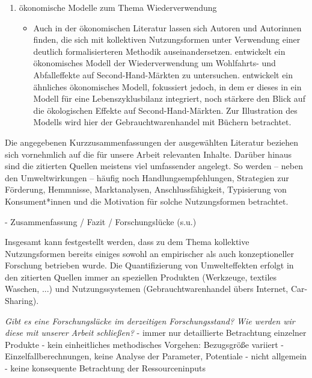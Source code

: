 \documentclass[11pt, titlepage=true]{scrartcl} %
\newcommand{\was}[1]{\small\textit{#1}}
\begin{document}
\begin{enumerate}
\begin{itemize}
       \end{itemize}
     \item ökonomische Modelle zum Thema Wiederverwendung
       \begin{itemize}
         \item Auch in der ökonomischen Literatur lassen sich Autoren und
           Autorinnen finden, die sich mit kollektiven Nutzungsformen
           unter Verwendung einer deutlich formalisierteren Methodik
           auseinandersetzen. \textcite{yokoo_economic_2010} entwickelt ein
           ökonomisches Modell der Wiederverwendung um Wohlfahrts- und
           Abfalleffekte auf Second-Hand-Märkten zu untersuchen.
           \textcite{thomas_environmental_2011} entwickelt ein ähnliches
           ökonomisches Modell, fokussiert jedoch, in dem er dieses in ein Modell für
           eine Lebenszyklusbilanz integriert, noch stärkere den Blick auf die
           ökologischen Effekte auf Second-Hand-Märkten. Zur Illustration des
           Modells wird hier der Gebrauchtwarenhandel mit Büchern betrachtet.       \end{itemize}
\end{enumerate}

Die angegebenen Kurzzusammenfassungen der ausgewählten Literatur beziehen sich
vornehmlich auf die für unsere Arbeit relevanten Inhalte. Darüber hinaus sind
die zitierten Quellen meistens viel umfassender angelegt. So werden --
neben den Umweltwirkungen --  häufig noch
Handlungsempfehlungen, Strategien zur Förderung, Hemmnisse,
Marktanalysen, Anschlussfähigkeit, Typisierung von Konsument*innen und die
Motivation für solche Nutzungsformen betrachtet.

- Zusammenfassung / Fazit / Forschungslücke (s.u.)

Insgesamt kann festgestellt werden, dass zu dem Thema kollektive Nutzungsformen
bereits einiges sowohl an empirischer als auch konzeptioneller Forschung
betrieben wurde. Die Quantifizierung von Umwelteffekten erfolgt in den zitierten
Quellen immer an speziellen Produkten (Werkzeuge, textiles
Waschen, ...) und Nutzungssystemen (Gebrauchtwarenhandel übers Internet,
Car-Sharing). 
 
\was{Gibt es eine Forschungslücke im derzeitigen Forschungsstand? Wie werden wir
 diese mit unserer Arbeit schließen?}
 - immer nur detaillierte Betrachtung einzelner Produkte
 - kein einheitliches methodisches Vorgehen: Bezugsgröße variiert
 - Einzelfallberechnungen, keine Analyse der Parameter, Potentiale
 - nicht allgemein
 - keine konsequente Betrachtung der Ressourceninputs
 
\end{document}
